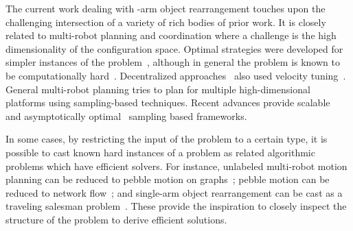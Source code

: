 %
The current work dealing with \dual-arm object rearrangement touches upon the challenging intersection of a variety of rich bodies of prior work. It is closely related to multi-robot planning and coordination where a challenge is the high dimensionality of the configuration space. %
Optimal strategies were developed for simpler instances of the problem~\cite{SolYuZamHal15}, although in general the problem is known to be computationally hard~\cite{solovey2016hardness}. Decentralized approaches~\cite{van2005prioritized} also used velocity tuning~\cite{leroy1999multiple}. General multi-robot planning tries to plan for multiple high-dimensional platforms \cite{wagner2012probabilistic,Gharbi:2009fu} using sampling-based techniques. 
Recent advances provide scalable~\cite{SoloveySH16:ijrr} and asymptotically optimal~\cite{Dobson:2017aa,Shome2019} sampling based frameworks. 


In some cases, by restricting the input of the problem to a certain type, it is possible to cast known hard instances of a problem as related algorithmic problems which have efficient solvers. For instance, unlabeled multi-robot motion planning can be reduced to pebble motion on graphs~\cite{abhs-unlabeled14}; pebble motion can be reduced to network flow~\cite{yu2016optimal}; and single-arm object rearrangement can be cast as a traveling salesman problem~\cite{193}. These provide the inspiration to closely inspect the structure of the problem to derive efficient solutions.


